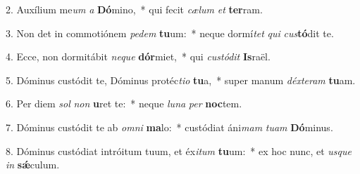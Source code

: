 2. Auxílium me\textit{um} \textit{a} \textbf{Dó}mino,~*  qui fecit \textit{cæ}\textit{lum} \textit{et} \textbf{ter}ram.\

3. Non det in commotiónem \textit{pe}\textit{dem} \textbf{tu}um:~*  neque dormí\textit{tet} \textit{qui} \textit{cus}\textbf{tó}dit te.\

4. Ecce, non dormitábit \textit{ne}\textit{que} \textbf{dór}miet,~*  qui \textit{cus}\textit{tó}\textit{dit} \textbf{Is}raël.\

5. Dóminus custódit te, Dóminus protéc\textit{ti}\textit{o} \textbf{tu}a,~*  super manum \textit{déx}\textit{te}\textit{ram} \textbf{tu}am.\

6. Per diem \textit{sol} \textit{non} \textbf{u}ret te:~*  neque \textit{lu}\textit{na} \textit{per} \textbf{noc}tem.\

7. Dóminus custódit te ab \textit{om}\textit{ni} \textbf{ma}lo:~*  custódiat áni\textit{mam} \textit{tu}\textit{am} \textbf{Dó}minus.\

8. Dóminus custódiat intróitum tuum, et éx\textit{i}\textit{tum} \textbf{tu}um:~*  ex hoc nunc, et \textit{us}\textit{que} \textit{in} \textbf{sǽ}culum.\

